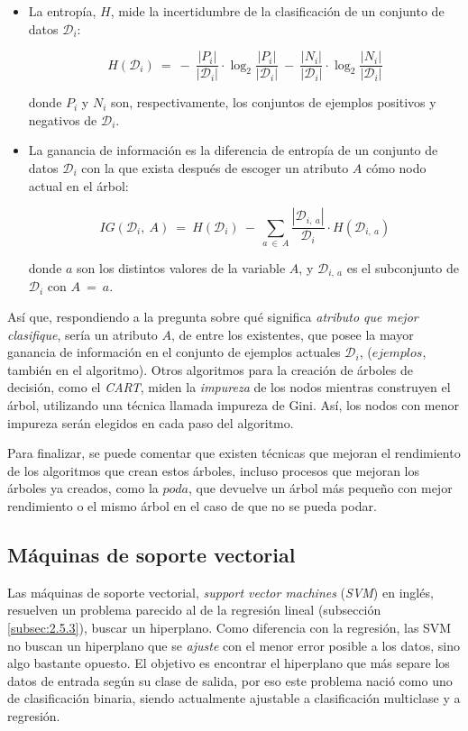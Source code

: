 \begin{itemize}
\item[\textbullet]La entropía, $H$, mide la incertidumbre de la clasificación de un conjunto de datos $\mathcal{D}_{i}$:

$$
H(\mathcal{D}_{i})\:=\:-\:\frac{|P_{i}|}{|\mathcal{D}_{i}|}\cdot\log_{2}\frac{|P_{i}|}{|\mathcal{D}_{i}|}\:-\:\frac{|N_{i}|}{|\mathcal{D}_{i}|}\cdot\log_{2}\frac{|N_{i}|}{|\mathcal{D}_{i}|}
$$

\noindent
donde $P_{i}$ y $N_{i}$ son, respectivamente, los conjuntos de ejemplos positivos y negativos de $\mathcal{D}_{i}$.

\item[\textbullet]La ganancia de información es la diferencia de entropía de un conjunto de datos $\mathcal{D}_{i}$ con la que exista después de escoger un atributo $A$ cómo nodo actual en el árbol:

$$
IG(\mathcal{D}_{i},\:A)\:=\:H(\mathcal{D}_{i})\:-\:\sum_{a\:\in\:A}\frac{|\mathcal{D}_{i,\:a}|}{\mathcal{D}_{i}}\cdot H(\mathcal{D}_{i,\:a})
$$

donde $a$ son los distintos valores de la variable $A$, y $\mathcal{D}_{i,\:a} $ es el subconjunto de $\mathcal{D}_{i}$ con $A\:=\:a$.
\end{itemize}

Así que, respondiendo a la pregunta sobre qué significa \emph{atributo que mejor clasifique}, sería un atributo $A$, de entre los existentes, que posee la mayor ganancia de información en el conjunto de ejemplos actuales $\mathcal{D}_{i}$, ($ejemplos$, también en el algoritmo). Otros algoritmos para la creación de árboles de decisión, como el \emph{CART}, miden la \emph{impureza} de los nodos mientras construyen el árbol, utilizando una técnica llamada impureza de Gini. Así, los nodos con menor impureza serán elegidos en cada paso del algoritmo.

Para finalizar, se puede comentar que existen técnicas que mejoran el rendimiento de los algoritmos que crean estos árboles, incluso procesos que mejoran los árboles ya creados, como la $poda$, que devuelve un árbol más pequeño con mejor rendimiento o el mismo árbol en el caso de que no se pueda podar.

\subsection{Máquinas de soporte vectorial} \label{subsec:3.1.2}

Las máquinas de soporte vectorial, \emph{support vector machines} (\emph{SVM}) en inglés, resuelven un problema parecido al de la regresión lineal (subsección \ref{subsec:2.5.3}), buscar un hiperplano. Como diferencia con la regresión, las SVM no buscan un hiperplano que se \emph{ajuste} con el menor error posible a los datos, sino algo bastante opuesto. El objetivo es encontrar el hiperplano que más separe los datos de entrada según su clase de salida, por eso este problema nació como uno de clasificación binaria, siendo actualmente ajustable a clasificación multiclase y a regresión.

